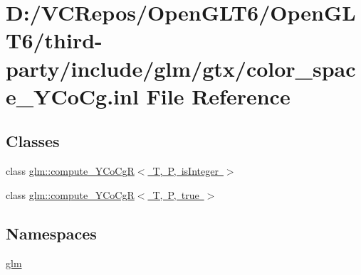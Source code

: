 \hypertarget{color__space___y_co_cg_8inl}{}\section{D\+:/\+V\+C\+Repos/\+Open\+G\+L\+T6/\+Open\+G\+L\+T6/third-\/party/include/glm/gtx/color\+\_\+space\+\_\+\+Y\+Co\+Cg.inl File Reference}
\label{color__space___y_co_cg_8inl}
\subsection*{Classes}
\begin{DoxyCompactItemize}
\item 
class \mbox{\hyperlink{classglm_1_1compute___y_co_cg_r}{glm\+::compute\+\_\+\+Y\+Co\+Cg\+R$<$ T, P, is\+Integer $>$}}
\item 
class \mbox{\hyperlink{classglm_1_1compute___y_co_cg_r_3_01_t_00_01_p_00_01true_01_4}{glm\+::compute\+\_\+\+Y\+Co\+Cg\+R$<$ T, P, true $>$}}
\end{DoxyCompactItemize}
\subsection*{Namespaces}
\begin{DoxyCompactItemize}
\item 
 \mbox{\hyperlink{namespaceglm}{glm}}
\end{DoxyCompactItemize}
